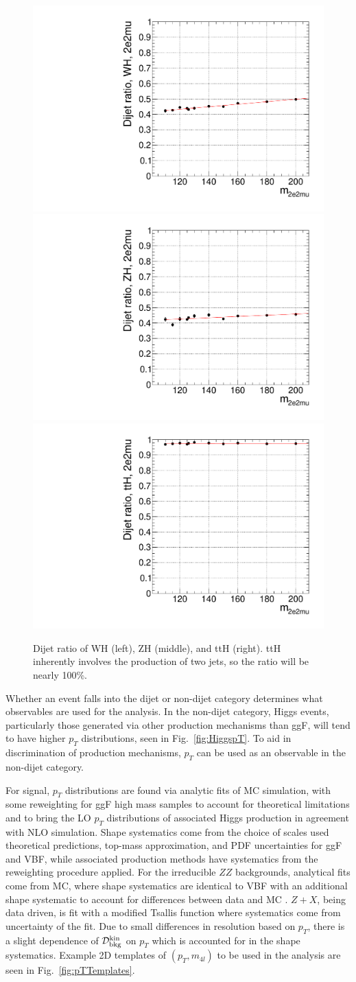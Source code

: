 \begin{figure}[htbp]
\begin{center}
\includegraphics[width=.3\linewidth]{HiggsDiscovery/figures/eff_WH_2e2mu_ratio.pdf}
\includegraphics[width=.3\linewidth]{HiggsDiscovery/figures/eff_ZH_2e2mu_ratio.pdf}
\includegraphics[width=.3\linewidth]{HiggsDiscovery/figures/eff_ttH_2e2mu_ratio.pdf}
\caption[Dijet Ratio of Associated Production as Function of $m_H$]{Dijet ratio of WH (left), ZH (middle), and ttH (right). ttH inherently involves the production of two jets, so the ratio will be nearly 100\%.}
\label{fig:DijetRatioAss}
\end{center}
\end{figure}

Whether an event falls into the dijet or non-dijet category determines what observables are used for the analysis. In the non-dijet category, Higgs events, particularly those generated via other production mechanisms than ggF, will tend to have higher $p_T$ distributions, seen in Fig.~\ref{fig:HiggspT}. To aid in discrimination of production mechanisms, $p_T$ can be used as an observable in the non-dijet category.

For signal, $p_T$ distributions are found via analytic fits of MC simulation, with some reweighting for ggF high mass samples to account for theoretical limitations and to bring the LO $p_T$ distributions of associated Higgs production in agreement with NLO simulation. Shape systematics come from the choice of scales used theoretical predictions, top-mass approximation, and PDF uncertainties for ggF and VBF, while associated production methods have systematics from the reweighting procedure applied. For the irreducible $ZZ$ backgrounds, analytical fits come from MC, where shape systematics are identical to VBF with an additional shape systematic to account for differences between data and MC \cite{ZZpTShapeSyst:2012}. $Z+X$, being data driven, is fit with a modified Tsallis function \cite{Tsallis:2012} where systematics come from uncertainty of the fit. Due to small differences in resolution based on $p_T$, there is a slight dependence of $\mathcal{D}_{\rm{bkg}}^{\rm{kin}}$ on $p_T$ which is accounted for in the shape systematics. Example 2D templates of $(p_T,m_{4l})$ to be used in the analysis are seen in Fig.~\ref{fig:pTTemplates}.

